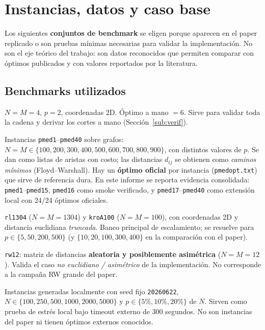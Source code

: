 \section{Instancias, datos y caso base}
\label{sec:instancias}

Los siguientes \textbf{conjuntos de benchmark} se eligen porque aparecen en el paper replicado o
son pruebas mínimas necesarias para validar la implementación. No son el eje teórico del trabajo:
son datos reconocidos que permiten comparar con óptimos publicados y con valores reportados por
la literatura.

\subsection{Benchmarks utilizados}
\begin{description}[leftmargin=1.5em]
  \item[\texttt{toy1} (caso base mínimo).] $N=M=4$, $p=2$, coordenadas 2D. Óptimo a mano $=6$.
        Sirve para validar toda la cadena y derivar los cortes a mano
        (Sección~\ref{sub:verif}).
  \item[OR-Library (Beasley, 1990).] Instancias \texttt{pmed1}--\texttt{pmed40} sobre grafos:
        $N=M\in\{100,200,300,400,500,600,700,800,900\}$, con distintos valores de $p$. Se dan
        como listas de aristas con costo; las distancias $d_{ij}$ se obtienen como \emph{caminos
        mínimos} (Floyd--Warshall). Hay un \textbf{óptimo oficial} por instancia
        (\texttt{pmedopt.txt}) que sirve de referencia dura. En este informe se reporta evidencia
        consolidada: \texttt{pmed1}--\texttt{pmed15}, \texttt{pmed16} como smoke verificado, y
        \texttt{pmed17}--\texttt{pmed40} como extensión local con 24/24 óptimos oficiales.
  \item[TSP-Library (Reinelt, 1991).] \texttt{rl1304} ($N=M=1304$) y \texttt{kroA100} ($N=M=100$),
        con coordenadas 2D y distancia euclidiana \emph{truncada}. Banco principal de escalamiento;
        se resuelve para $p\in\{5,50,200,500\}$ (y $\{10,20,100,300,400\}$ en la comparación con
        el paper).
  \item[RW local mínimo.] \texttt{rw12}: matriz de distancias \textbf{aleatoria y posiblemente
        asimétrica} ($N=M=12$). Valida el caso \emph{no euclidiano / asimétrico} de la
        implementación. No corresponde a la campaña RW grande del paper.
  \item[Grilla sintética euclidiana.] Instancias generadas localmente con seed fijo
        \texttt{20260622}, $N\in\{100,250,500,1000,2000,5000\}$ y
        $p\in\{5\%,10\%,20\%\}$ de $N$. Sirven como prueba de estrés local bajo timeout externo
        de 300 segundos. No son instancias del paper ni tienen óptimos externos conocidos.
\end{description}

